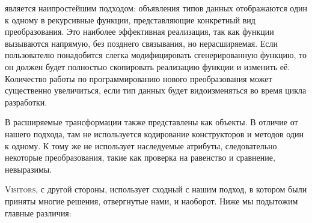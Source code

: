  является наипростейшим подходом: объявления типов данных отображаются один к одному в рекурсивные функции, представляющие конкретный вид преобразования. Это наиболее эффективная реализация, так как функции вызываются напрямую, без позднего связывания, но нерасширяемая. Если пользователю понадобится слегка модифицировать сгенерированную функцию, то он должен будет полностью скопировать реализацию функции и изменить её. Количество работы по программированию нового преобразования может существенно увеличиться, если тип данных будет видоизменяться во время цикла разработки.

В  расширяемые трансформации также представлены как объекты. В отличие от нашего подхода, там не используется кодирование конструкторов и методов один к одному. К тому же  не использует наследуемые атрибуты, следовательно некоторые преобразования, такие как проверка на равенство и сравнение, невыразимы.

\textsc{Visitors}, с другой стороны, использует сходный с нашим подход, в котором были приняты многие решения, отвергнутые нами, и наоборот.
Ниже мы подытожим главные различия:

